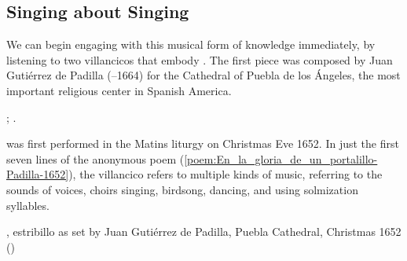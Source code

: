 \subsection{Singing about Singing}

We can begin engaging with this musical form of knowledge immediately, by
listening to two villancicos that embody .%
    \Autocites
    {Murata:Singing}
    [\XXX]{Illari:Polychoral}
The first piece was composed by Juan Gutiérrez de Padilla (--1664)
for the Cathedral of Puebla de los Ángeles, the most important religious center
in Spanish America.%
\begin{Footnote}
    ; 
    \autocites
    {Puebla:Microfilm}
    {Stanford:Catalog}
    {Padilla:1652ChristmasCD}.
\end{Footnote}
 was first performed in the Matins liturgy
on Christmas Eve 1652.  
In just the first seven lines of the anonymous poem
(\cref{poem:En_la_gloria_de_un_portalillo-Padilla-1652}), the villancico refers
to multiple kinds of music, referring to the sounds of voices, choirs singing,
birdsong, dancing, and using solmization syllables.

{, estribillo as set by Juan Gutiérrez
de Padilla, Puebla Cathedral, Christmas 1652 
()}

